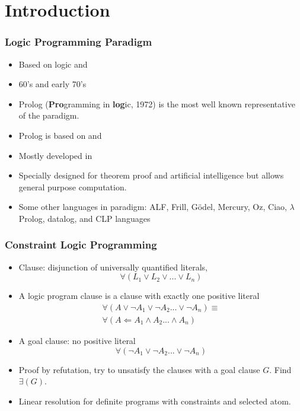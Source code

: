 \section{Introduction}
\begin{frame}
\frametitle{Logic Programming Paradigm}
\begin{itemize}
\item Based on logic and 
\item 60's and early 70's 
\item Prolog (\textbf{Pro}gramming in \textbf{log}ic, 1972) is
	the most well known representative of the paradigm.
\item Prolog is based on  and 
\item Mostly developed in 
\item Specially designed for theorem proof and artificial intelligence but
	allows general purpose computation.
\item Some other languages in paradigm: ALF, Frill, Gödel, Mercury, Oz,
Ciao, $\lambda$Prolog, datalog, and CLP languages
\end{itemize}
\end{frame}

\begin{frame}
\frametitle{Constraint Logic Programming}
\begin{itemize}
\item
Clause: disjunction of universally quantified literals,
\[ \forall(L_1 \vee L_2 \vee ... \vee L_n) \]
\item
A logic program clause is a clause with exactly one
positive literal
\[ \begin{array}{l}
   \forall(A \vee \neg A_1 \vee \neg A_2 ... \vee \neg A_n) \equiv \\
   \forall(A \Leftarrow A_1 \wedge A_2 ... \wedge  A_n) 
\end{array}\] 

\item
A goal clause: no positive literal
\[ \forall(\neg A_1 \vee \neg A_2 ... \vee \neg A_n) \]

\item
Proof by refutation, try to unsatisfy the clauses with
a goal clause $G$. Find $\exists(G)$.
\item
Linear resolution for definite programs with constraints and
selected atom.
\end{itemize}
\end{frame}

